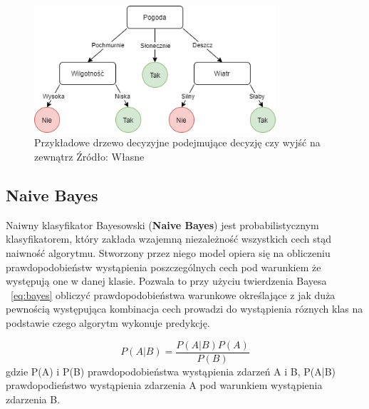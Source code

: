 \begin{figure}[h]
    \centering
    \includegraphics[width=0.8\textwidth]{./Img/BinaryTree.png}
    \caption{Przykładowe drzewo decyzyjne podejmujące decyzję czy wyjść na zewnątrz Źródło: Własne}
\end{figure}


\subsection{Naive Bayes}

Naiwny klasyfikator Bayesowski (\textbf{Naive Bayes}) jest probabilistycznym klasyfikatorem, który
zakłada wzajemną niezależność wszystkich cech stąd naiwność algorytmu. Stworzony przez niego model
opiera się na obliczeniu prawdopodobieństw wystąpienia poszczególnych cech pod warunkiem że 
występują one w danej klasie. Pozwala to przy użyciu twierdzenia Bayesa ~\ref{eq:bayes} obliczyć prawdopodobieństwa 
warunkowe określające z jak duża pewnością występująca kombinacja cech prowadzi do 
wystąpienia róznych klas na podstawie czego algorytm wykonuje predykcję. 


\begin{equation}
    \label{eq:bayes}
    P(A|B) = \frac{P(A|B)P(A)}{P(B)}
\end{equation}
gdzie P(A) i P(B) prawdopodobieństwa wystąpienia zdarzeń A i B, P(A|B) prawdopodieństwo wystąpienia
zdarzenia A pod warunkiem wystąpienia zdarzenia B.

